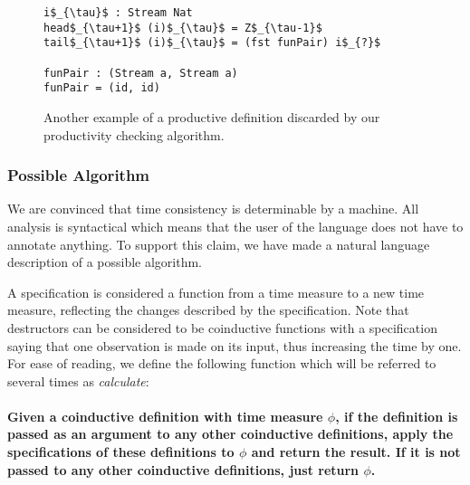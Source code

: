 \begin{figure}
\begin{Verbatim}[commandchars=\\\{\},codes={\catcode`$=3\catcode`_=8}]
i$_{\tau}$ : Stream Nat
head$_{\tau+1}$ (i)$_{\tau}$ = Z$_{\tau-1}$
tail$_{\tau+1}$ (i)$_{\tau}$ = (fst funPair) i$_{?}$

funPair : (Stream a, Stream a)
funPair = (id, id)
\end{Verbatim}
\caption{Another example of a productive definition discarded by our productivity checking algorithm.}
\label{fig:funList}
\end{figure}

\subsubsection{Possible Algorithm}
We are convinced that time consistency is determinable by a machine. All analysis is syntactical which means that the user of the language does not have to annotate anything. To support this claim, we have made a natural language description of a possible algorithm. 

A specification is considered a function from a time measure to a new time measure, reflecting the changes described by the specification. Note that destructors can be considered to be coinductive functions with a specification saying that one observation is made on its input, thus increasing the time by one. For ease of reading, we define the following function which will be referred to several times as \textit{calculate}:

\paragraph{
Given a coinductive definition with time measure $\phi$, if the definition is passed as an argument to any other coinductive definitions, apply the specifications of these definitions to $\phi$ and return the result. If it is not passed to any other coinductive definitions, just return $\phi$.}
